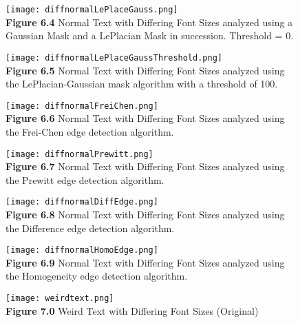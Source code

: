 \documentclass{article}%
\begin{document}
\newpage
\begin{figure}[h]
\centering
\texttt{[image: diffnormalLePlaceGauss.png]}\\
{\bf Figure 6.4} Normal Text with Differing Font Sizes analyzed using a Gaussian Mask and a LePlacian Mask in succession. Threshold = 0.   
\end{figure}

\newpage
\begin{figure}[h]
\centering
\texttt{[image: diffnormalLePlaceGaussThreshold.png]}\\
{\bf Figure 6.5} Normal Text with Differing Font Sizes analyzed using the LePlacian-Gaussian mask algorithm with a threshold of 100.  
\end{figure}

\newpage
\begin{figure}[h]
\centering
\texttt{[image: diffnormalFreiChen.png]}\\
{\bf Figure 6.6} Normal Text with Differing Font Sizes analyzed using the Frei-Chen edge detection algorithm.  
\end{figure}

\newpage
\begin{figure}[h]
\centering
\texttt{[image: diffnormalPrewitt.png]}\\
{\bf Figure 6.7} Normal Text with Differing Font Sizes analyzed using the Prewitt edge detection algorithm.  
\end{figure}

\newpage
\begin{figure}[h]
\centering
\texttt{[image: diffnormalDiffEdge.png]}\\
{\bf Figure 6.8} Normal Text with Differing Font Sizes analyzed using the Difference edge detection algorithm.  
\end{figure}

\newpage
\begin{figure}[h]
\centering
\texttt{[image: diffnormalHomoEdge.png]}\\
{\bf Figure 6.9} Normal Text with Differing Font Sizes analyzed using the Homogeneity edge detection algorithm.  
\end{figure}

\clearpage


\newpage
\begin{figure}[h]
\centering
\texttt{[image: weirdtext.png]}\\
{\bf Figure 7.0} Weird Text with Differing Font Sizes (Original)
\end{figure}
\end{document}
